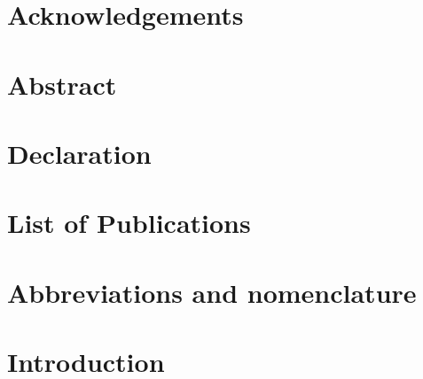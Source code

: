 \documentclass[12pt, oneside]{book}
\newcommand\blankpage{%
    \null
    \thispagestyle{empty}%
    \addtocounter{page}{-1}%
    \newpage}
\begin{document}
\chapter{Acknowledgements}

\afterpage{\blankpage}

\chapter{Abstract}

\afterpage{\blankpage}

\chapter{Declaration}

\afterpage{\blankpage}

\chapter{List of Publications}

\afterpage{\blankpage}




\tableofcontents
\listoftables
\listoffigures

\chapter{Abbreviations and nomenclature}



\mainmatter

\chapter{Introduction}

\end{document}
